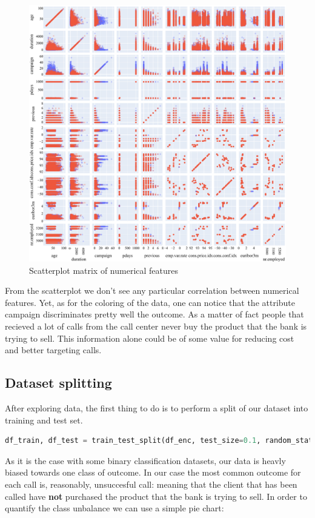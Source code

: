 \begin{figure}[H]
    \centering
    \includegraphics[scale=0.55]{pictures/scatterplot.pdf}
    \caption{Scatterplot matrix of numerical features }
\end{figure}
From the scatterplot we don't see any particular correlation between numerical features. Yet, as for the coloring of the data, one can notice that the attribute campaign discriminates pretty well the outcome. As a matter of fact people that recieved a lot of calls from the call center never buy the product that the bank is trying to sell. This information alone could be of some value for reducing cost and better targeting calls.

\subsection{Dataset splitting}
After exploring data, the first thing to do is to perform a split of our dataset into training and test set.
\begin{lstlisting}[language=Python, caption= Data splitting]
    df_train, df_test = train_test_split(df_enc, test_size=0.1, random_state=42)
\end{lstlisting}
As it is the case with some binary classification datasets, our data is heavly biased towards one class of outcome. In our case the most common outcome for each call is, reasonably, unsuccesful call: meaning that the client that has been called have \textbf{not} purchased the product that the bank is trying to sell. In order to quantify the class unbalance we can use a simple pie chart:


